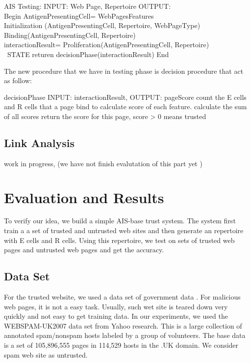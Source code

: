 \documentclass{llncs}
\begin{document}
\begin{itemize}
\begin{algorithmic}
\STATE AIS Testing:  INPUT: Web Page, Repertoire OUTPUT:\\
\STATE Begin 
\STATE  AntigenPresentingCell= WebPagesFeatures\\
\STATE Initialization (AntigenPresentingCell, Repertoire, WebPageType)\\
\STATE Binding(AntigenPresentingCell, Repertoire)\\
\STATE interactionResult=  Proliferation(AntigenPresentingCell, Repertoire)\\
\ STATE returen decisionPhase(interactionResult)
\STATE End\\
\end{algorithmic}
The new procedure that we have in testing phase is decision procedure that act as follow:\\
\begin{algorithmic}
\STATE decisionPhase INPUT: interactionResult, OUTPUT: pageScore
\STATE       count the E cells and R cells that a page bind to  
\STATE  calculate score of each feature. 
\STATE calculate the sum of all scores 
\STATE return the score for this page,
\STATE  score > 0 means trusted
\end{algorithmic}
\end{itemize}

\subsection{Link Analysis}
work in progress, (we have not finish evalutation of  this part yet )
\section{Evaluation and Results}
To verify our idea, we build a simple AIS-base trust system. The system first
train a a set of trusted and untrusted web sites and then generate an
repertoire with E cells and R cells. Using this repertoire, we test on sets of
trusted web pages and untrusted web pages and get the accuracy. 

\subsection{Data Set}
For the trusted website, we used a data set of government data \cite{WTX}. For
malicious web pages, it is not a easy task. Usually, such wet site is teared
down very quickly and not easy to get training data. In our experiments, we
used the WEBSPAM-UK2007 data set \cite{WEBSPAM-UK2007} from Yahoo research.
This is a large collection of annotated spam/nonspam hosts labeled by a group of volunteers. The base data is a set of 105,896,555 pages in 114,529 hosts in the .UK domain. We consider spam web site as untrusted. 
\end{document}
